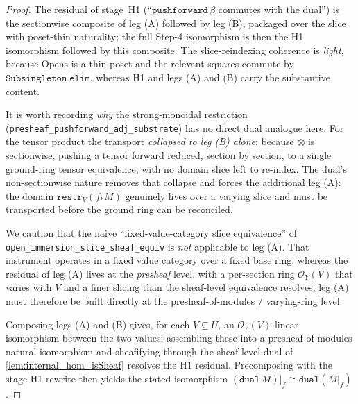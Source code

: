 \begin{proof}
  The residual of stage~H1 (``\(\mathtt{pushforward}\,\beta\) commutes with the dual'') is
  the sectionwise composite of leg (A) followed by leg (B), packaged over the slice with
  poset-thin naturality; the full Step-4 isomorphism is then the H1 isomorphism followed by
  this composite. The slice-reindexing coherence is \emph{light}, because \(\mathrm{Opens}\)
  is a thin poset and the relevant squares commute by \(\mathtt{Subsingleton.elim}\),
  whereas H1 and legs (A) and (B) carry the substantive content.

  It is worth recording \emph{why} the strong-monoidal restriction
  (\texttt{presheaf\_pushforward\_adj\_substrate}) has no direct dual analogue here. For
  the tensor product the transport \emph{collapsed to leg (B) alone}: because \(\otimes\)
  is sectionwise, pushing a tensor forward reduced, section by section, to a single
  ground-ring tensor equivalence, with no domain slice left to re-index. The dual's
  non-sectionwise nature removes that collapse and forces the additional leg (A): the
  domain \(\mathtt{restr}_V(f_*M)\) genuinely lives over a varying slice and must be
  transported before the ground ring can be reconciled.

  We caution that the naive ``fixed-value-category slice equivalence'' of
  \texttt{open\_immersion\_slice\_sheaf\_equiv} is \emph{not} applicable to leg (A). That instrument
  operates in a fixed value category over a fixed base ring, whereas the residual of
  leg (A) lives at the \emph{presheaf} level, with a per-section ring \(\mathcal{O}_Y(V)\)
  that varies with \(V\) and a finer slicing than the sheaf-level equivalence resolves;
  leg (A) must therefore be built directly at the presheaf-of-modules / varying-ring level.

  Composing legs (A) and (B) gives, for each \(V \subseteq U\), an
  \(\mathcal{O}_Y(V)\)-linear isomorphism between the two values; assembling these into a
  presheaf-of-modules natural isomorphism and sheafifying through the sheaf-level dual of
  \cref{lem:internal_hom_isSheaf} resolves the H1 residual. Precomposing with the stage-H1
  rewrite then yields the stated isomorphism
  \((\mathtt{dual}\,M)|_f \cong \mathtt{dual}(M|_f)\).


\end{proof}
